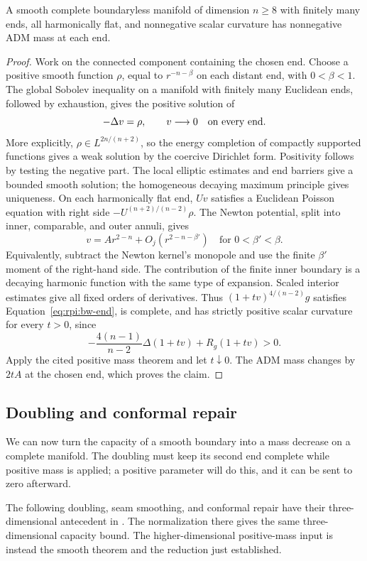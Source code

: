 \begin{lemma}\label{lem:rpi:harmonic-pmt}
A smooth complete boundaryless manifold of dimension $n\ge8$ with finitely many
ends, all harmonically flat, and nonnegative scalar curvature has nonnegative
ADM mass at each end.
\end{lemma}
\begin{proof}
Work on the connected component containing the chosen end.
Choose a positive smooth function $\rho$, equal to $r^{-n-\beta}$ on
each distant end, with $0<\beta<1$. The global Sobolev inequality on a
manifold with finitely many Euclidean ends, followed by exhaustion,
gives the positive solution of
\[
 -\Delta v=\rho,\qquad v\longrightarrow0\quad\hbox{on every end}.
\]
More explicitly, $\rho\in L^{2n/(n+2)}$, so the energy completion of
compactly supported functions gives a weak solution by the coercive
Dirichlet form. Positivity follows by testing the negative part.
The local elliptic estimates and end barriers give a bounded smooth
solution; the homogeneous decaying maximum principle gives uniqueness.
On each harmonically flat end, $Uv$ satisfies a Euclidean Poisson
equation with right side $-U^{(n+2)/(n-2)}\rho$. The Newton potential,
split into inner, comparable, and outer annuli, gives
\[
 v=A r^{2-n}+O_j(r^{2-n-\beta'})
 \quad\text{for }0<\beta'<\beta.
\]
Equivalently, subtract the Newton kernel's monopole and use the
finite $\beta'$ moment of the right-hand side. The contribution of
the finite inner boundary is a decaying harmonic function with the
same type of expansion. Scaled interior estimates give all fixed
orders of derivatives. Thus $(1+t v)^{4/(n-2)}g$ satisfies
Equation~\eqref{eq:rpi:bw-end}, is complete, and has strictly positive
scalar curvature for every $t>0$, since
\[
 -\frac{4(n-1)}{n-2}\Delta(1+t v)+R_g(1+t v)>0.
\]
Apply the cited positive mass theorem and let $t\downarrow0$.
The ADM mass changes by $2tA$ at the chosen end, which proves the
claim.
\end{proof}

\subsection{Doubling and conformal repair}

We can now turn the capacity of a smooth boundary into a mass
decrease on a complete manifold. The doubling must keep its second
end complete while positive mass is applied; a positive parameter
will do this, and it can be sent to zero afterward.

The following doubling, seam smoothing, and conformal repair have
their three-dimensional antecedent in
\cite[Definition~17 and Theorem~9, pp.~206--211]{Bray2001}.
The normalization there gives the same three-dimensional capacity
bound. The higher-dimensional positive-mass input is instead the
smooth theorem and the reduction just established.

